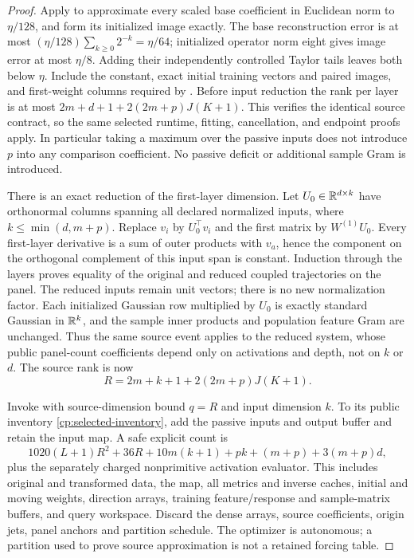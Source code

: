 \begin{proof}
Apply  to approximate every scaled base coefficient
in Euclidean norm to $\eta/128$, and form its initialized image
exactly. The base reconstruction error is at most
$(\eta/128)\sum_{k\ge0}2^{-k}=\eta/64$; initialized operator norm
eight gives image error at most $\eta/8$. Adding their independently
controlled Taylor tails leaves both below $\eta$.
Include the constant, exact initial training vectors and paired
images, and first-weight columns required by .
Before input
reduction the rank per layer is at most
$2m+d+1+2(2m+p)J(K+1)$.
This verifies the identical source contract, so the same selected
runtime, fitting, cancellation, and endpoint proofs apply. In
particular taking a maximum over the passive inputs does not
introduce $p$ into any comparison coefficient. No passive deficit
or additional sample Gram is introduced.

There is an exact reduction of the first-layer dimension. Let
$U_0\in\mathbb R^{d\times k}$ have orthonormal columns spanning all
declared normalized inputs, where $k\le\min(d,m+p)$.
Replace $v_i$ by $U_0^\top v_i$ and the first matrix by
$W^{(1)}U_0$. Every first-layer derivative is a sum of outer
products with $v_a$, hence the component on the orthogonal
complement of this input span is constant. Induction through
the layers proves equality of the original and reduced coupled
trajectories on the panel. The reduced inputs remain unit vectors;
there is no new normalization factor. Each initialized Gaussian
row multiplied by $U_0$ is exactly standard Gaussian in $\mathbb R^k$,
and the sample inner products and population feature Gram are
unchanged. Thus the same source event applies to the reduced
system, whose public panel-count coefficients depend only on activations
and depth, not on $k$ or $d$. The source rank is now
\[
 R=2m+k+1+2(2m+p)J(K+1).
\]

Invoke  with source-dimension bound $q=R$ and
input dimension $k$. To its public inventory
\eqref{cp:selected-inventory}, add the passive inputs and output
buffer and retain the input map. A safe explicit count is
\[
 1020(L+1)R^2+36R+10m(k+1)+pk+(m+p)
                         +3(m+p)d,
\]
plus the separately charged nonprimitive activation evaluator.
This includes original and transformed data, the map, all metrics
and inverse caches, initial and moving weights, direction arrays,
training feature/response and sample-matrix buffers, and query
workspace. Discard the dense arrays, source coefficients, origin
jets, panel anchors and partition schedule. The optimizer is
autonomous; a partition used to prove source approximation is not
a retained forcing table.


\end{proof}
